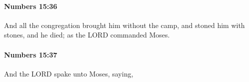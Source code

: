		\paragraph{Numbers 15:36} %
			\label{NUMBERS-15-36}

			And all the congregation brought him without the camp, and stoned him with stones, and he died; as the LORD commanded Moses.


		\paragraph{Numbers 15:37} %
			\label{NUMBERS-15-37}

			And the LORD spake unto Moses, saying,


